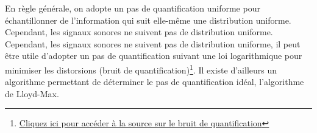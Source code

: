 En règle générale, on adopte un pas de quantification uniforme pour échantillonner de l'information qui suit elle-même une distribution uniforme. Cependant, les signaux sonores ne suivent pas de distribution uniforme. Cependant, les signaux sonores ne suivent pas de distribution uniforme, il peut être utile d'adopter un pas de quantification suivant une loi logarithmique pour minimiser les distorsions (bruit de quantification)\footnote{\href{https://fr.wikipedia.org/wiki/Quantification_\%28signal\%29}{Cliquez ici pour accéder à la source sur le bruit de quantification}}. Il existe d'ailleurs un algorithme permettant de déterminer le pas de quantification idéal, l'algorithme de Lloyd-Max.

